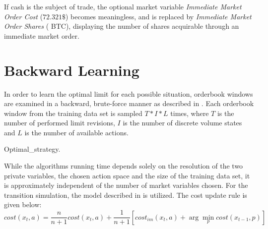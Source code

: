 If cash is the subject of trade, the optional market variable \emph{Immediate Market Order Cost}  (\eg $72.321\$$) becomes meaningless, and is replaced by \emph{Immediate Market Order Shares} ( BTC), displaying the number of shares acquirable through an immediate market order.



\section{Backward Learning}
\label{chap:backwardlearning}
In order to learn the optimal limit for each possible situation, orderbook windows are examined in a backward, brute-force manner as described in . Each orderbook window from the training data set is sampled $T*I*L$ times, where $T$ is the number of performed limit revisions, $I$ is the number of discrete volume states and $L$ is the number of available actions.\\

\begin{algorithm}[H] 
 \caption{Optimal\_strategy\Cite{Nevmyvaka:2006}.}
     \SetAlgoLined
     \footnotesize
     

\label{alg:bruteforce:pseudocode}
\end{algorithm}\bigskip

While the algorithms running time depends solely on the resolution of the two private variables, the chosen action space and the size of the training data set, it is approximately independent of the number of market variables chosen. For the transition simulation, the model described in  is utilized. The cost update rule is given below: 
\begin{equation}\label{eq:costfunction}
   cost(x_t, a) = \dfrac{n}{n+1} cost(x_t, a) + \dfrac{1}{n+1} [cost_{im}(x_t,a) + \arg\min_{p}cost(x_{t-1}, p)]
\end{equation}

